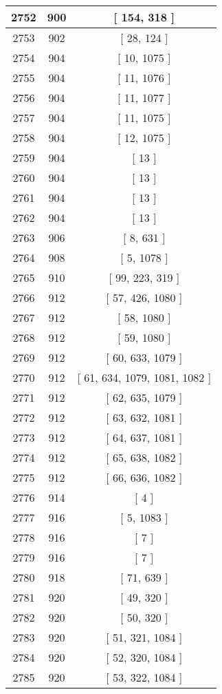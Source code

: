 \begin{center}
\begin{longtable}[H]{|| c c c ||}
\hline
2752 & 900 & [ 154, 318 ] \\ 
\hline
2753 & 902 & [ 28, 124 ] \\ 
\hline
2754 & 904 & [ 10, 1075 ] \\ 
\hline
2755 & 904 & [ 11, 1076 ] \\ 
\hline
2756 & 904 & [ 11, 1077 ] \\ 
\hline
2757 & 904 & [ 11, 1075 ] \\ 
\hline
2758 & 904 & [ 12, 1075 ] \\ 
\hline
2759 & 904 & [ 13 ] \\ 
\hline
2760 & 904 & [ 13 ] \\ 
\hline
2761 & 904 & [ 13 ] \\ 
\hline
2762 & 904 & [ 13 ] \\ 
\hline
2763 & 906 & [ 8, 631 ] \\ 
\hline
2764 & 908 & [ 5, 1078 ] \\ 
\hline
2765 & 910 & [ 99, 223, 319 ] \\ 
\hline
2766 & 912 & [ 57, 426, 1080 ] \\ 
\hline
2767 & 912 & [ 58, 1080 ] \\ 
\hline
2768 & 912 & [ 59, 1080 ] \\ 
\hline
2769 & 912 & [ 60, 633, 1079 ] \\ 
\hline
2770 & 912 & [ 61, 634, 1079, 1081, 1082 ] \\ 
\hline
2771 & 912 & [ 62, 635, 1079 ] \\ 
\hline
2772 & 912 & [ 63, 632, 1081 ] \\ 
\hline
2773 & 912 & [ 64, 637, 1081 ] \\ 
\hline
2774 & 912 & [ 65, 638, 1082 ] \\ 
\hline
2775 & 912 & [ 66, 636, 1082 ] \\ 
\hline
2776 & 914 & [ 4 ] \\ 
\hline
2777 & 916 & [ 5, 1083 ] \\ 
\hline
2778 & 916 & [ 7 ] \\ 
\hline
2779 & 916 & [ 7 ] \\ 
\hline
2780 & 918 & [ 71, 639 ] \\ 
\hline
2781 & 920 & [ 49, 320 ] \\ 
\hline
2782 & 920 & [ 50, 320 ] \\ 
\hline
2783 & 920 & [ 51, 321, 1084 ] \\ 
\hline
2784 & 920 & [ 52, 320, 1084 ] \\ 
\hline
2785 & 920 & [ 53, 322, 1084 ] \\ 

\end{longtable}
\end{center}
